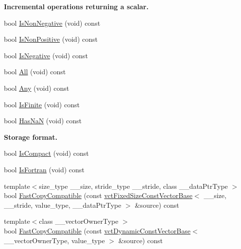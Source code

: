 \begin{Indent}{\bf Incremental operations returning a scalar.}
\begin{DoxyCompactItemize}
\item 
bool \hyperlink{classvct_fixed_size_const_vector_base_a0dd3b76cdec4fa3b54816cb878c5cb28}{Is\+Non\+Negative} (void) const 
\item 
bool \hyperlink{classvct_fixed_size_const_vector_base_a4158db8c718b0fe65cd9a2328d9cac0b}{Is\+Non\+Positive} (void) const 
\item 
bool \hyperlink{classvct_fixed_size_const_vector_base_a9306ec231b0528ef5b881461ea1ff8d8}{Is\+Negative} (void) const 
\item 
bool \hyperlink{classvct_fixed_size_const_vector_base_a302eaee9662d01603781e2f29bdaaebe}{All} (void) const 
\item 
bool \hyperlink{classvct_fixed_size_const_vector_base_aa3a86b1d3cae13dae3c33bd8541f4406}{Any} (void) const 
\item 
bool \hyperlink{classvct_fixed_size_const_vector_base_a7cf413f6effa64e31fe306f9ac11a97d}{Is\+Finite} (void) const 
\item 
bool \hyperlink{classvct_fixed_size_const_vector_base_a542964b8e6a6e430b24a50db0b9bf591}{Has\+Na\+N} (void) const 
\end{DoxyCompactItemize}
\end{Indent}
\begin{Indent}{\bf Storage format.}\par
\begin{DoxyCompactItemize}
\item 
bool \hyperlink{classvct_fixed_size_const_vector_base_ae3938e1b5a4e3822889f584568ba6629}{Is\+Compact} (void) const 
\item 
bool \hyperlink{classvct_fixed_size_const_vector_base_a29f89413c10a8bc6f266d43baa57b758}{Is\+Fortran} (void) const 
\item 
{\footnotesize template$<$size\+\_\+type \+\_\+\+\_\+size, stride\+\_\+type \+\_\+\+\_\+stride, class \+\_\+\+\_\+data\+Ptr\+Type $>$ }\\bool \hyperlink{classvct_fixed_size_const_vector_base_a01d4cd7d810371fa09e5e7154fb294bc}{Fast\+Copy\+Compatible} (const \hyperlink{classvct_fixed_size_const_vector_base}{vct\+Fixed\+Size\+Const\+Vector\+Base}$<$ \+\_\+\+\_\+size, \+\_\+\+\_\+stride, value\+\_\+type, \+\_\+\+\_\+data\+Ptr\+Type $>$ \&source) const 
\item 
{\footnotesize template$<$class \+\_\+\+\_\+vector\+Owner\+Type $>$ }\\bool \hyperlink{classvct_fixed_size_const_vector_base_ad85b7a0580923858f7bc6aa7bfcc60fb}{Fast\+Copy\+Compatible} (const \hyperlink{classvct_dynamic_const_vector_base}{vct\+Dynamic\+Const\+Vector\+Base}$<$ \+\_\+\+\_\+vector\+Owner\+Type, value\+\_\+type $>$ \&source) const 
\end{DoxyCompactItemize}
\end{Indent}
